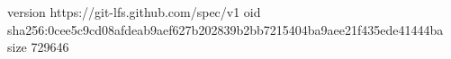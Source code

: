 version https://git-lfs.github.com/spec/v1
oid sha256:0cee5c9cd08afdeab9aef627b202839b2bb7215404ba9aee21f435ede41444ba
size 729646
